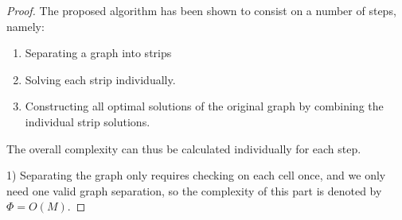 \documentclass[journal]{IEEEtran}
\begin{document}
\begin{proof}
The proposed algorithm has been shown to consist on a number of steps, namely: 
\begin{enumerate}
\item Separating a graph into strips 
\item Solving each strip individually. 
\item Constructing all optimal solutions of the original graph by combining the individual strip solutions. 
\end{enumerate}

\noindent
The overall complexity can thus be calculated individually for each step. 

1) Separating the graph only requires checking on each cell once, and we only need one valid graph separation, so the complexity of this part is denoted by $\Phi = O(M)$. 


\end{proof}
\end{document}
